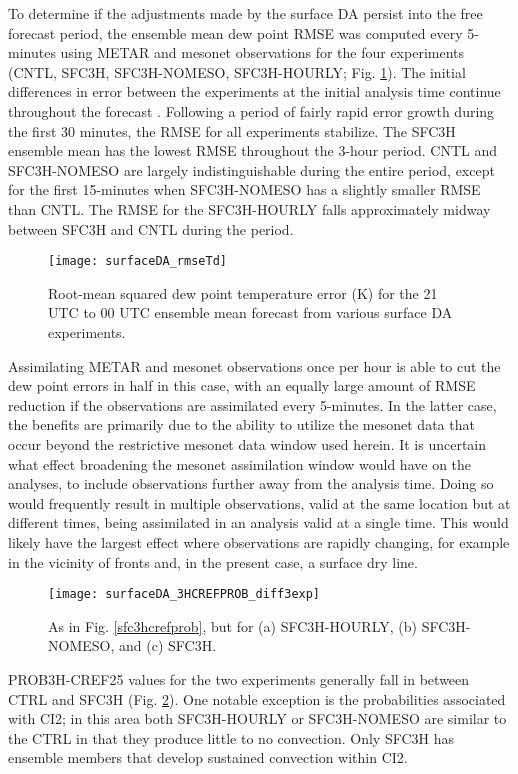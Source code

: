 To determine if the adjustments made by the surface DA persist into the free forecast period, the ensemble mean dew point RMSE was computed every 5-minutes using METAR and mesonet observations for the four experiments (CNTL, SFC3H, SFC3H-NOMESO, SFC3H-HOURLY; Fig. \ref{sfcmeantdrmse}). The initial differences in error between the experiments at the initial analysis time continue throughout the forecast . Following a period of fairly rapid error growth during the first 30 minutes, the RMSE for all experiments stabilize. The SFC3H ensemble mean has the lowest RMSE throughout the 3-hour period. CNTL and SFC3H-NOMESO are largely indistinguishable during the entire period, except for the first 15-minutes when SFC3H-NOMESO has a slightly smaller RMSE than CNTL. The RMSE for the SFC3H-HOURLY falls approximately midway between SFC3H and CNTL during the period. 
\begin{figure}
\centering
\texttt{[image: surfaceDA\_rmseTd]}
\caption{Root-mean squared dew point temperature error (K) for the 21 UTC to 00 UTC ensemble mean forecast from various surface DA experiments.}
\label{sfcmeantdrmse}
\end{figure}
Assimilating METAR and mesonet observations once per hour is able to cut the dew point errors in half in this case, with an equally large amount of RMSE reduction if the observations are assimilated every 5-minutes. In the latter case, the benefits are primarily due to the ability to utilize the mesonet data that occur beyond the restrictive mesonet data window used herein. It is uncertain what effect broadening the mesonet assimilation window would have on the analyses, to include observations further away from the analysis time. Doing so would frequently result in multiple observations, valid at the same location but at different times, being assimilated in an analysis valid at a single time. This would likely have the largest effect where observations are rapidly changing, for example in the vicinity of fronts and, in the present case, a surface dry line. 

\begin{figure}
\centering
\texttt{[image: surfaceDA\_3HCREFPROB\_diff3exp]}
\caption{As in Fig. \ref{sfc3hcrefprob}, but for (a) SFC3H-HOURLY, (b) SFC3H-NOMESO, and (c) SFC3H.}
\label{3hcrefprob_diff3exp}
\end{figure}

PROB3H-CREF25 values for the two experiments generally fall in between CTRL and SFC3H (Fig. \ref{3hcrefprob_diff3exp}). One notable exception is the probabilities associated with CI2; in this area both SFC3H-HOURLY or SFC3H-NOMESO are similar to the CTRL in that they produce little to no convection. Only SFC3H has ensemble members that develop sustained convection within CI2.

